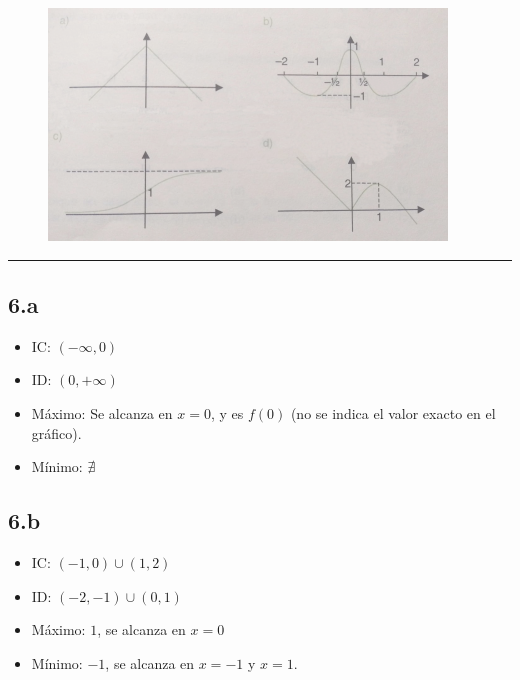 \documentclass{article}
\begin{document}
\begin{figure}[ht]
\includegraphics[scale=3]{../img/guide_01/ex_06.png} 
\centering
\label{fig:6}
\end{figure}

\hrule

\subsection*{6.a}
\label{subsec:6.a}

\begin{itemize}

\item IC: $(-\infty, 0)$

\item ID: $(0, +\infty)$

\item Máximo: Se alcanza en $x = 0$, y es $f(0)$ (no se indica el valor exacto en el gráfico).

\item Mínimo: $\nexists$

\end{itemize}

\subsection*{6.b}
\label{subsec:6.b}

\begin{itemize}

\item IC: $(-1, 0) \cup (1, 2)$

\item ID: $(-2, -1) \cup (0, 1)$

\item Máximo: $1$, se alcanza en $x = 0$

\item Mínimo: $-1$, se alcanza en $x = -1$ y $x = 1$.

\end{itemize}
\end{document}
